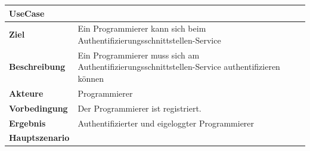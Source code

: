 \begin{longtable}[c]{@{}ll@{}}
\toprule
\begin{minipage}[b]{0.34\columnwidth}\raggedright\strut
\textbf{UseCase}
\strut\end{minipage} &
\begin{minipage}[b]{0.60\columnwidth}\raggedright\strut
\strut\end{minipage}\tabularnewline
\midrule
\endhead
\begin{minipage}[t]{0.34\columnwidth}\raggedright\strut
\textbf{Ziel}
\strut\end{minipage} &
\begin{minipage}[t]{0.60\columnwidth}\raggedright\strut
Ein Programmierer kann sich beim
Authentifizierungsschnittstellen-Service
\strut\end{minipage}\tabularnewline
\begin{minipage}[t]{0.34\columnwidth}\raggedright\strut
\textbf{Beschreibung}
\strut\end{minipage} &
\begin{minipage}[t]{0.60\columnwidth}\raggedright\strut
Ein Programmierer muss sich am Authentifizierungsschnittstellen-Service
authentifizieren können
\strut\end{minipage}\tabularnewline
\begin{minipage}[t]{0.34\columnwidth}\raggedright\strut
\textbf{Akteure}
\strut\end{minipage} &
\begin{minipage}[t]{0.60\columnwidth}\raggedright\strut
Programmierer
\strut\end{minipage}\tabularnewline
\begin{minipage}[t]{0.34\columnwidth}\raggedright\strut
\textbf{Vorbedingung}
\strut\end{minipage} &
\begin{minipage}[t]{0.60\columnwidth}\raggedright\strut
Der Programmierer ist registriert.
\strut\end{minipage}\tabularnewline
\begin{minipage}[t]{0.34\columnwidth}\raggedright\strut
\textbf{Ergebnis}
\strut\end{minipage} &
\begin{minipage}[t]{0.60\columnwidth}\raggedright\strut
Authentifizierter und eigeloggter Programmierer
\strut\end{minipage}\tabularnewline
\begin{minipage}[t]{0.34\columnwidth}\raggedright\strut
\textbf{Hauptszenario}
\strut\end{minipage} &

\end{longtable}
